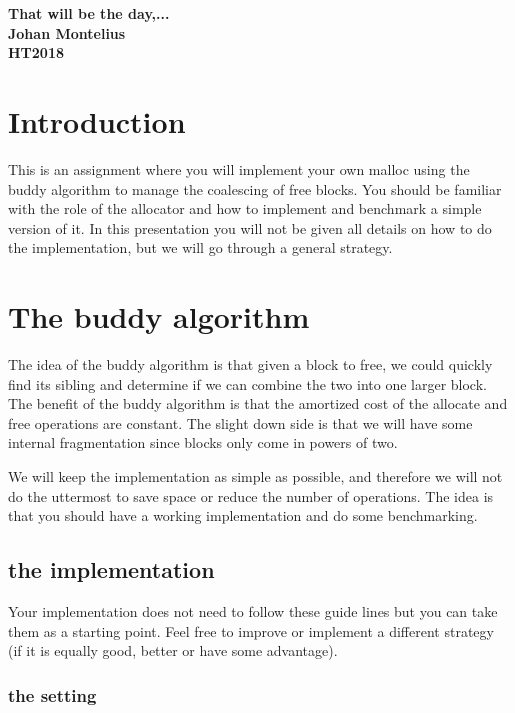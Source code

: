 \documentclass[a4paper,11pt]{article}
\begin{document}
\begin{center} \vspace{20pt} \textbf{\large That will be the day,...}\\
\vspace{10pt} \textbf{Johan Montelius}\\ \vspace{10pt} \textbf{HT2018}
\end{center}


\section{Introduction}

This is an assignment where you will implement your own malloc using
the buddy algorithm to manage the coalescing of free blocks. You
should be familiar with the role of the allocator and how to implement
and benchmark a simple version of it. In this presentation you will not be
given all details on how to do the implementation, but we will go
through a general strategy.


\section{The buddy algorithm}

The idea of the buddy algorithm is that given a block to free, we could
quickly find its sibling and determine if we can combine the two into
one larger block. The benefit of the buddy algorithm is that the
amortized cost of the allocate and free operations are constant. The
slight down side is that we will have some internal fragmentation
since blocks only come in powers of two.

We will keep the implementation as simple as possible, and therefore we will not
do the uttermost to save space or reduce the number of operations. The
idea is that you should have a working implementation and do some
benchmarking.


\subsection{the implementation}

Your implementation does not need to follow these guide lines but you
can take them as a starting point. Feel free to improve or implement a
different strategy (if it is equally good, better or have some
advantage).



\subsubsection{the setting}
\end{document}
